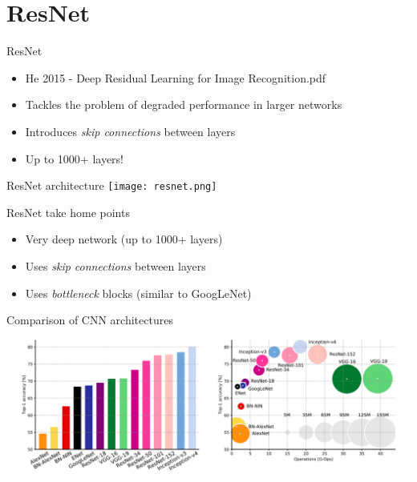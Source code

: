 \documentclass[9pt, aspectratio=169]{beamer}
\begin{document}
\section{ResNet}

\begin{frame}
    {ResNet}
    \begin{itemize}
        \item He 2015 - Deep Residual Learning for Image Recognition.pdf
        \item Tackles the problem of degraded performance in larger networks
        \item Introduces \textit{skip connections} between layers
        \item Up to 1000+ layers!
    \end{itemize}
\end{frame}

\begin{frame}
    {ResNet architecture}
    \centering
    \texttt{[image: resnet.png]}
\end{frame}

\begin{frame}
    {ResNet take home points}
    \begin{itemize}
        \item Very deep network (up to 1000+ layers)
        \item Uses \textit{skip connections} between layers 
        \item Uses \textit{bottleneck} blocks (similar to GoogLeNet)
    \end{itemize}
\end{frame}

\begin{frame}
    {Comparison of CNN architectures}
    \centering
    \includegraphics[width=\textwidth]{comparison.png}
\end{frame}
\end{document}
